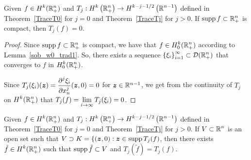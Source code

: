 \begin{prop} \label{sobTrace0K}
Given $\displaystyle f \in H^k(\mathbb{R}^n_+)$ and
$\displaystyle T_j:H^k\left(\mathbb{R}^n_+\right) \to
H^{k-j-1/2}\left(\mathbb{R}^{n-1}\right)$
defined in Theorem~\ref{TraceT0} for $j=0$ and Theorem~\ref{TraceTj}
for $j>0$.  If $\displaystyle \operatorname{supp} f \subset \mathbb{R}^n_+$ is compact,
then $T_j(f) = 0$.  
\end{prop}

\begin{proof}
Since $\operatorname{supp} f \subset \mathbb{R}^n_+$ is compact, we have that
$\displaystyle f \in H^k_0(\mathbb{R}^n_+)$ according to Lemma~\ref{sob_w0_trad1}.
So, there exists a sequence
$\displaystyle \left\{ \xi_i \right\}_{i=1}^\infty \subset \mathcal{D}(\mathbb{R}^n_+)$
that converges to $f$ in $\displaystyle H^k_0(\mathbb{R}^n_+)$.

Since
$\displaystyle T_j(\xi_i)({\bm{z}}) = \frac{\displaystyle \partial^{j}{\xi_i}} {\displaystyle \partial x_n^{j}}({\bm{z}},0) = 0$
for ${\bm{z}} \in \mathbb{R}^{n-1}$, we get from the continuity of $T_j$ on
$\displaystyle H^k(\mathbb{R}^n_+)$ that
$\displaystyle T_j(f) = \lim_{i\to \infty} T_j(\xi_i) = 0$.
\end{proof}

\begin{prop} \label{sobTjDomain}
Given $\displaystyle f \in H^k(\mathbb{R}^n_+)$ and
$\displaystyle T_j:H^k\left(\mathbb{R}^n_+\right) \to H^{k-j-1/2}\left(\mathbb{R}^{n-1}\right)$
defined in Theorem~\ref{TraceT0} for $j=0$ and Theorem~\ref{TraceTj}
for $j>0$.  If $\displaystyle V \subset \mathbb{R}^n$ is an open set such that
$V \supset K = \{ ({\bm{z}},0) : {\bm{z}} \in \operatorname{supp} T_j(f)$, then there
exists $\displaystyle \tilde{f} \in H^k(\mathbb{R}^n_+)$ such that
$\operatorname{supp} \tilde{f} \subset V$ and $T_j(\tilde{f}) = T_j(f)$.
\end{prop}

